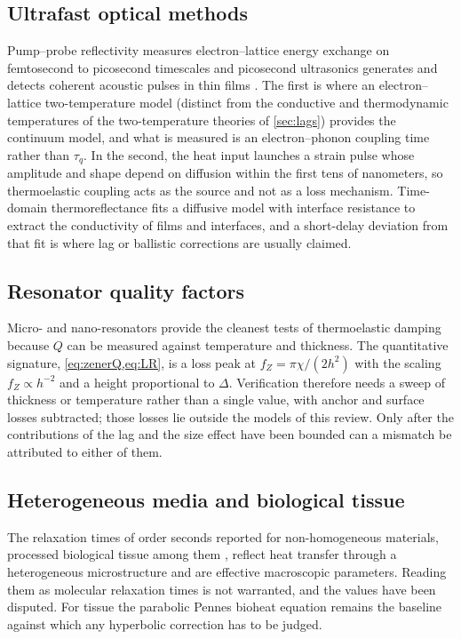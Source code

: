 \subsection{Ultrafast optical methods}
Pump--probe reflectivity measures electron--lattice energy exchange on femtosecond to picosecond timescales \citep{Brorson1987} and picosecond ultrasonics generates and detects coherent acoustic pulses in thin films \citep{Thomsen1986}. The first is where an electron--lattice two-temperature model (distinct from the conductive and thermodynamic temperatures of the two-temperature theories of \cref{sec:lags}) provides the continuum model, and what is measured is an electron--phonon coupling time rather than $\tau_q$. In the second, the heat input launches a strain pulse whose amplitude and shape depend on diffusion within the first tens of nanometers, so thermoelastic coupling acts as the source and not as a loss mechanism. Time-domain thermoreflectance \citep{Cahill2003} fits a diffusive model with interface resistance to extract the conductivity of films and interfaces, and a short-delay deviation from that fit is where lag or ballistic corrections are usually claimed.

\subsection{Resonator quality factors}
Micro- and nano-resonators provide the cleanest tests of thermoelastic damping because $Q$ can be measured against temperature and thickness. The quantitative signature, \cref{eq:zenerQ,eq:LR}, is a loss peak at $f_Z=\pi\chi/(2h^2)$ with the scaling $f_Z\propto h^{-2}$ and a height proportional to $\Delta$. Verification therefore needs a sweep of thickness or temperature rather than a single value, with anchor and surface losses subtracted; those losses lie outside the models of this review. Only after the contributions of the lag and the size effect have been bounded can a mismatch be attributed to either of them.

\subsection{Heterogeneous media and biological tissue}
The relaxation times of order seconds reported for non-homogeneous materials, processed biological tissue among them \citep{Mitra1995,Kaminski1990}, reflect heat transfer through a heterogeneous microstructure and are effective macroscopic parameters. Reading them as molecular relaxation times is not warranted, and the values have been disputed. For tissue the parabolic Pennes bioheat equation \citep{Pennes1948} remains the baseline against which any hyperbolic correction has to be judged.

